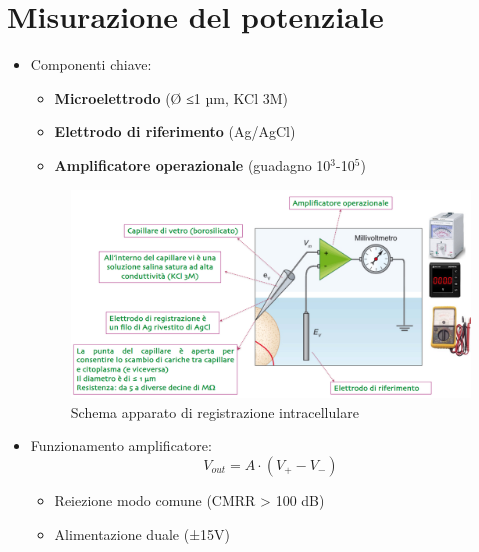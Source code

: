\documentclass{article}
\begin{document}
\section{Misurazione del potenziale}
\begin{itemize}
\item Componenti chiave:
  \begin{itemize}
  \item \textbf{Microelettrodo} (Ø ≤1 µm, KCl 3M)
  \item \textbf{Elettrodo di riferimento} (Ag/AgCl)
  \item \textbf{Amplificatore operazionale} (guadagno 10\(^3\)-10\(^5\))
  \end{itemize}

\begin{figure}[h]
\centering
\includegraphics[width=1\textwidth]{Neuroscienze 2024-2025/Modulo I/Immagini Modulo I/Screenshot 2025-06-21 at 17-44-45 6. Differenza di potenziale e sua misurazione .pdf.png}
\caption{Schema apparato di registrazione intracellulare}
\label{fig:amplificatore}
\end{figure}

\item Funzionamento amplificatore:
  \[
  V_{out} = A \cdot (V_+ - V_-)
  \]
  \begin{itemize}
  \item Reiezione modo comune (CMRR > 100 dB)
  \item Alimentazione duale (±15V)
  \end{itemize}
\end{itemize}

\end{document}
